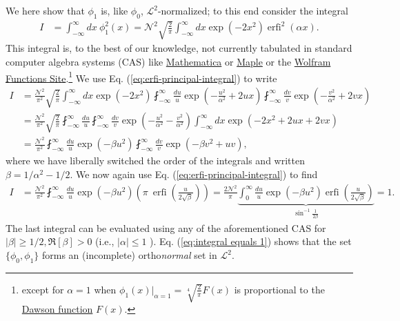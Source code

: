 \documentclass[english,12pt]{shreyasnotes}
\newcommand{\eq}[1]{\begin{align}#1\end{align}}
\DeclareMathOperator{\erfi}{erfi}
\begin{document}
We here show that $\phi_1$ is, like $\phi_0$, $\mathcal{L}^2$-normalized; to this end consider the integral
\eq{
  I&=\int_{-\infty}^\infty dx \ \phi_1^2\left(x\right) =\mathcal{N}^2\sqrt{\frac{2}{\pi}}\int_{-\infty}^\infty dx  \exp\left(-2x^2\right)\erfi^2\left(\alpha x\right).
}
This integral is, to the best of our knowledge, not currently tabulated in standard computer algebra systems (CAS) like \href{http://www.wolfram.com/mathematica/}{Mathematica} or \href{http://www.maplesoft.com/}{Maple} or the \href{http://functions.wolfram.com/GammaBetaErf/Erfi/}{Wolfram Functions Site}.\footnote{except for $\alpha=1$ when $\phi_1(x)|_{\alpha=1} = \sqrt[4]{\frac{2}{\pi}} F(x) $ is proportional to the \href{https://mathworld.wolfram.com/DawsonsIntegral.html}{Dawson function} $F(x)$.}
We use Eq. (\ref{eq:erfi-principal-integral}) to write
\begin{subequations}
\eq{
  I&=\frac{\mathcal{N}^2}{\pi^2}\sqrt{\frac{2}{\pi}}\int_{-\infty}^\infty dx\exp\left(-2x^2\right)\fint_{-\infty}^\infty \frac{du}{u} \exp\left(-\frac{u^2}{\alpha^2}+2ux\right)\fint_{-\infty}^\infty \frac{dv}{v} \exp\left(-\frac{v^2}{\alpha^2}+2vx\right)\\
  &=\frac{\mathcal{N}^2}{\pi^2}\sqrt{\frac{2}{\pi}}\fint_{-\infty}^\infty \frac{du}{u}\fint_{-\infty}^\infty \frac{dv}{v}
  \exp\left(-\frac{u^2}{\alpha^2}-\frac{v^2}{\alpha^2}\right) \int_{-\infty}^\infty dx \exp\left(-2x^2+2ux+2vx\right)\\
  &=\frac{\mathcal{N}^2}{\pi^2}\fint_{-\infty}^\infty \frac{du}{u}\exp\left(-\beta u^2\right)\fint_{-\infty}^\infty \frac{dv}{v}
  \exp\left(-\beta v^2+uv\right),
}
\end{subequations}
where we have liberally switched the order of the integrals and written $\beta=1/\alpha^2-1/2$. We now again use Eq. (\ref{eq:erfi-principal-integral}) to find
\eq{
  I&=\frac{\mathcal{N}^2}{\pi^2}\fint_{-\infty}^\infty \frac{du}{u}\exp\left(-\beta u^2\right)\left(\pi \ \erfi\left(\frac{u}{2\sqrt{\beta}}\right)\right)
  =\frac{2\mathcal{N}^2}{\pi}\underbrace{\int_{0}^\infty \frac{du}{u}\exp\left(-\beta u^2\right)\erfi\left(\frac{u}{2\sqrt{\beta}}\right)}_{\sin^{-1}\frac{1}{2\beta}}
  =1.
  \label{eq:integral equals 1}
}
The last integral can be evaluated using any of the aforementioned CAS for $\left|\beta\right|\geq1/2,\Re\left[\beta\right]>0$ (i.e., $\left|\alpha\right|\leq 1$%
). Eq. (\ref{eq:integral equals 1}) shows that the set $\{\phi_0,\phi_1 \}$ forms an (incomplete) ortho\emph{normal} set in $\mathcal{L}^2$.
\end{document}
